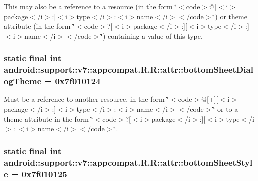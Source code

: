 This may also be a reference to a resource (in the form \char`\"{}$<$code$>$@\mbox{[}$<$i$>$package$<$/i$>$:\mbox{]}$<$i$>$type$<$/i$>$:$<$i$>$name$<$/i$>$$<$/code$>$\char`\"{}) or theme attribute (in the form \char`\"{}$<$code$>$?\mbox{[}$<$i$>$package$<$/i$>$:\mbox{]}\mbox{[}$<$i$>$type$<$/i$>$:\mbox{]}$<$i$>$name$<$/i$>$$<$/code$>$\char`\"{}) containing a value of this type. \hypertarget{classandroid_1_1support_1_1v7_1_1appcompat_1_1_r_1_1attr_06ab87effd3660027d73f70efd0fbaea}{
\subsubsection[{bottomSheetDialogTheme}]{\setlength{\rightskip}{0pt plus 5cm}static final int android::support::v7::appcompat.R.R::attr::bottomSheetDialogTheme = 0x7f010124}}
\label{classandroid_1_1support_1_1v7_1_1appcompat_1_1_r_1_1attr_06ab87effd3660027d73f70efd0fbaea}


Must be a reference to another resource, in the form \char`\"{}$<$code$>$@\mbox{[}+\mbox{]}\mbox{[}$<$i$>$package$<$/i$>$:\mbox{]}$<$i$>$type$<$/i$>$:$<$i$>$name$<$/i$>$$<$/code$>$\char`\"{} or to a theme attribute in the form \char`\"{}$<$code$>$?\mbox{[}$<$i$>$package$<$/i$>$:\mbox{]}\mbox{[}$<$i$>$type$<$/i$>$:\mbox{]}$<$i$>$name$<$/i$>$$<$/code$>$\char`\"{}. \hypertarget{classandroid_1_1support_1_1v7_1_1appcompat_1_1_r_1_1attr_1de302254bf460a5580a4e6d52c6da79}{
\subsubsection[{bottomSheetStyle}]{\setlength{\rightskip}{0pt plus 5cm}static final int android::support::v7::appcompat.R.R::attr::bottomSheetStyle = 0x7f010125}}
\label{classandroid_1_1support_1_1v7_1_1appcompat_1_1_r_1_1attr_1de302254bf460a5580a4e6d52c6da79}


